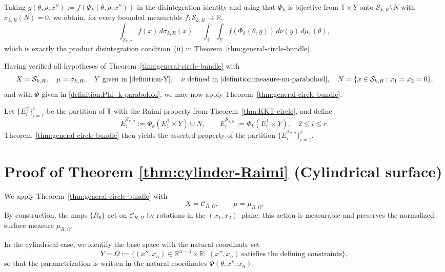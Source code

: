 \documentclass[11pt]{article}
\numberwithin{equation}{section}
\theoremstyle{remark}
\begin{document}
Taking $g(\theta,\rho,x''):=f(\Phi_k(\theta,\rho,x''))$ in the
disintegration identity and using that $\Phi_k$ is bijective from $\mathbb{T} \times Y$ onto $\mathcal{S}_{k,R}\setminus N$ with
$\sigma_{k,R}(N)=0$, we obtain, for every bounded measurable
$f:\mathcal{S}_{k,R}\to\mathbb{R}$,
\[
\int_{\mathcal{S}_{k,R}} f(x)\,d\sigma_{k,R}(x)
 = \int_\mathbb{T} \int_Y f(\Phi_k(\theta,y))\,d\nu(y)\,d\mu_1(\theta),
\]
which is exactly the product disintegration condition~(ii) in Theorem~\ref{thm:general-circle-bundle}.

\medskip\noindent
Having verified all hypotheses of Theorem~\ref{thm:general-circle-bundle} with
\[
X=\mathcal{S}_{k,R},\quad 
\mu=\sigma_{k,R},\quad
Y \text{ given in } \eqref{definition-Y},\quad
\nu \text{ defined in \eqref{definition:measure-nu-paraboloid}},\quad
N=\{x\in \mathcal{S}_{k,R}: x_1=x_2=0\},
\]
and with $\Phi$ given in \eqref{definition:Phi_k-paraboloid}, we may now apply Theorem~\ref{thm:general-circle-bundle}.

Let $\{E_i^\mathbb{T}\}_{i=1}^r$ be the partition of $\mathbb{T}$ with the Raimi property from Theorem~\ref{thm:KKT-circle}, and define
\[
E_1^{\mathcal{S}_{k,R}} := \Phi_k(E_1^\mathbb{T}\times Y)\cup N,\qquad
E_i^{\mathcal{S}_{k,R}} := \Phi_k(E_i^\mathbb{T} \times Y),\quad 2\le i\le r.
\]
Theorem~\ref{thm:general-circle-bundle} then yields the asserted property of the partition $\{E_i^{\mathcal{S}_{k,R}}\}_{i=1}^r$.





\section{Proof of Theorem \ref{thm:cylinder-Raimi} (Cylindrical surface)}\label{section-cylinder}

We apply Theorem~\ref{thm:general-circle-bundle} with
\[
X = \mathcal{C}_{R,\Omega}, \qquad \mu = \mu_{R,\Omega}.
\]
By construction, the maps $\{R_\theta\}$ act on $\mathcal{C}_{R,\Omega}$ by
rotations in the $(x_1,x_2)$–plane; this action is measurable and preserves
the normalized surface measure $\mu_{R,\Omega}$.

\medskip
In the cylindrical case, we identify the base space with the natural
coordinate set
\[
Y=\Omega:=\{(x'',x_n)\in\mathbb{R}^{n-3}\times\mathbb{R}:\ (x'',x_n)
\ \text{satisfies the defining constraints}\},
\]
so that the parametrization is written in the natural coordinates
$\Phi(\theta,x'',x_n)$.
\end{document}
